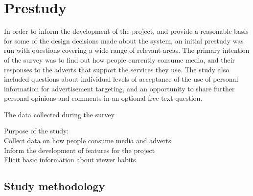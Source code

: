 \section{Prestudy}
\label{sec:prestudy}
In order to inform the development of the project, and provide a reasonable basis for some of the design decisions made about the system, an initial prestudy was run with questions covering a wide range of relevant areas. The primary intention of the survey was to find out how people currently consume %
media, and their responses to the adverts that support the services they use. The study also included questions about individual levels of acceptance of the use of personal information for advertisement targeting, and an opportunity to share further personal opinions and comments in an optional free text question. %

The data collected during the survey 





Purpose of the study:\\
Collect data on how people consume media and adverts\\
Inform the development of features for the project\\
Elicit basic information about viewer habits

\subsection{Study methodology}

